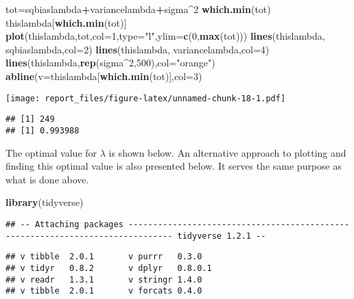 \documentclass[]{article}
\newenvironment{Shaded}{\begin{snugshade}}{\end{snugshade}}
\newcommand{\KeywordTok}[1]{\textcolor[rgb]{0.13,0.29,0.53}{\textbf{#1}}}
\newcommand{\DataTypeTok}[1]{\textcolor[rgb]{0.13,0.29,0.53}{#1}}
\newcommand{\DecValTok}[1]{\textcolor[rgb]{0.00,0.00,0.81}{#1}}
\newcommand{\StringTok}[1]{\textcolor[rgb]{0.31,0.60,0.02}{#1}}
\newcommand{\OperatorTok}[1]{\textcolor[rgb]{0.81,0.36,0.00}{\textbf{#1}}}
\newcommand{\NormalTok}[1]{#1}
\begin{document}
\begin{Shaded}
\begin{Highlighting}[]
\NormalTok{tot=sqbiaslambda}\OperatorTok{+}\NormalTok{variancelambda}\OperatorTok{+}\NormalTok{sigma}\OperatorTok{^}\DecValTok{2}
\KeywordTok{which.min}\NormalTok{(tot)}
\NormalTok{thislambda[}\KeywordTok{which.min}\NormalTok{(tot)]}
\KeywordTok{plot}\NormalTok{(thislambda,tot,}\DataTypeTok{col=}\DecValTok{1}\NormalTok{,}\DataTypeTok{type=}\StringTok{"l"}\NormalTok{,}\DataTypeTok{ylim=}\KeywordTok{c}\NormalTok{(}\DecValTok{0}\NormalTok{,}\KeywordTok{max}\NormalTok{(tot)))}
\KeywordTok{lines}\NormalTok{(thislambda, sqbiaslambda,}\DataTypeTok{col=}\DecValTok{2}\NormalTok{)}
\KeywordTok{lines}\NormalTok{(thislambda, variancelambda,}\DataTypeTok{col=}\DecValTok{4}\NormalTok{)}
\KeywordTok{lines}\NormalTok{(thislambda,}\KeywordTok{rep}\NormalTok{(sigma}\OperatorTok{^}\DecValTok{2}\NormalTok{,}\DecValTok{500}\NormalTok{),}\DataTypeTok{col=}\StringTok{"orange"}\NormalTok{)}
\KeywordTok{abline}\NormalTok{(}\DataTypeTok{v=}\NormalTok{thislambda[}\KeywordTok{which.min}\NormalTok{(tot)],}\DataTypeTok{col=}\DecValTok{3}\NormalTok{)}
\end{Highlighting}
\end{Shaded}

\texttt{[image: report\_files/figure-latex/unnamed-chunk-18-1.pdf]}

\begin{verbatim}
## [1] 249
## [1] 0.993988
\end{verbatim}

The optimal value for \(\lambda\) is shown below. An alternative
approach to plotting and finding this optimal value is also presented
below. It serves the same purpose as what is done above.

\begin{Shaded}
\begin{Highlighting}[]
\KeywordTok{library}\NormalTok{(tidyverse)}
\end{Highlighting}
\end{Shaded}

\begin{verbatim}
## -- Attaching packages ------------------------------------------------------------------------------- tidyverse 1.2.1 --
\end{verbatim}

\begin{verbatim}
## v tibble  2.0.1       v purrr   0.3.0  
## v tidyr   0.8.2       v dplyr   0.8.0.1
## v readr   1.3.1       v stringr 1.4.0  
## v tibble  2.0.1       v forcats 0.4.0
\end{verbatim}
\end{document}
